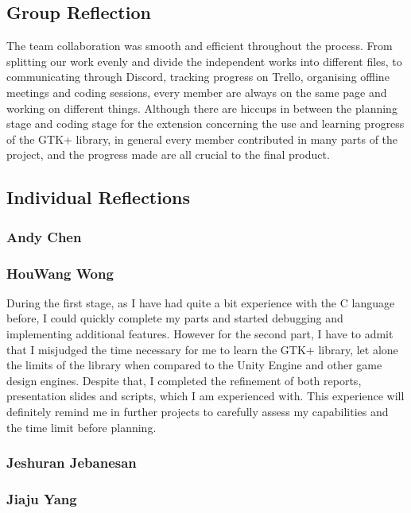 \documentclass[10pt]{article}
\begin{document}
\subsection{Group Reflection}
The team collaboration was smooth and efficient throughout the process. From splitting our work evenly and divide the independent works into different files, to communicating through Discord, tracking progress on Trello, organising offline meetings and coding sessions, every member are always on the same page and working on different things. Although there are hiccups in between the planning stage and coding stage for the extension concerning the use and learning progress of the GTK+ library, in general every member contributed in many parts of the project, and the progress made are all crucial to the final product.
\subsection{Individual Reflections}
\subsubsection{Andy Chen}
\subsubsection{HouWang Wong}
During the first stage, as I have had quite a bit experience with the C language before, I could quickly complete my parts and started debugging and implementing additional features. However for the second part, I have to admit that I misjudged the time necessary for me to learn the GTK+ library, let alone the limits of the library when compared to the Unity Engine and other game design engines. Despite that, I completed the refinement of both reports, presentation slides and scripts, which I am experienced with. This experience will definitely remind me in further projects to carefully assess my capabilities and the time limit before planning.
\subsubsection{Jeshuran Jebanesan}
\subsubsection{Jiaju Yang}
\end{document}
